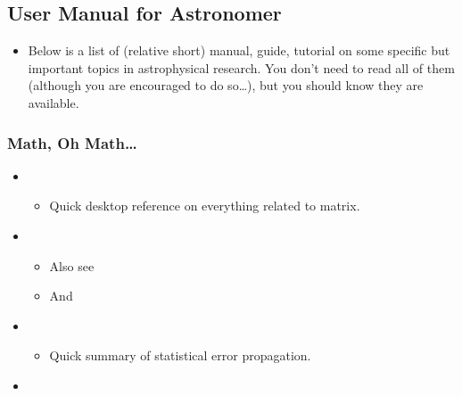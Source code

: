 \documentclass[letterpaper,10pt,english]{sphinxmanual}
\begin{document}
\subsection{User Manual for Astronomer}
\label{\detokenize{resource/astro/astro_readme:user-manual-for-astronomer}}\begin{itemize}
\item {} 
Below is a list of (relative short) manual, guide, tutorial on some
specific but important topics in astrophysical research. You don’t
need to read all of them (although you are encouraged to do so…), but
you should know they are available.

\end{itemize}


\subsubsection{Math, Oh Math…}
\label{\detokenize{resource/astro/astro_readme:math-oh-math}}\begin{itemize}
\item {} 
\begin{itemize}
\item {} 
Quick desktop reference on everything related to matrix.

\end{itemize}

\item {} 
\begin{itemize}
\item {} 
Also see 

\item {} 
And 

\end{itemize}

\item {} 
\begin{itemize}
\item {} 
Quick summary of statistical error propagation.

\end{itemize}

\item {} 

\end{itemize}
\end{document}
